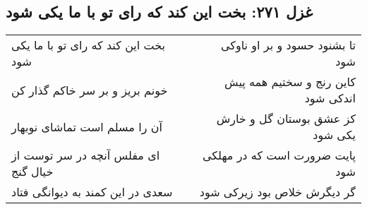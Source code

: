 \begin{center}
\section*{غزل ۲۷۱: بخت این کند که رای تو با ما یکی شود}
\label{sec:271}
\begin{longtable}{l p{0.5cm} r}
بخت این کند که رای تو با ما یکی شود
&&
تا بشنود حسود و بر او ناوکی شود
\\
خونم بریز و بر سر خاکم گذار کن
&&
کاین رنج و سختیم همه پیش اندکی شود
\\
آن را مسلم است تماشای نوبهار
&&
کز عشق بوستان گل و خارش یکی شود
\\
ای مفلس آنچه در سر توست از خیال گنج
&&
پایت ضرورت است که در مهلکی شود
\\
سعدی در این کمند به دیوانگی فتاد
&&
گر دیگرش خلاص بود زیرکی شود
\\
\end{longtable}
\end{center}
